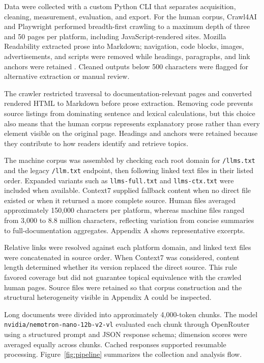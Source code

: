\documentclass[10pt,conference,a4paper]{IEEEtran}
\makeatletter
\def\subsection{\@startsection{subsection}{2}{\z@}{6pt}{3pt}{\normalfont\normalsize\itshape}}
\makeatother
\begin{document}
\subsection{Data Collection}

Data were collected with a custom Python CLI that separates acquisition, cleaning, measurement, evaluation, and export. For the human corpus, Crawl4AI and Playwright performed breadth-first crawling to a maximum depth of three and 50 pages per platform, including JavaScript-rendered sites. Mozilla Readability extracted prose into Markdown; navigation, code blocks, images, advertisements, and scripts were removed while headings, paragraphs, and link anchors were retained \cite{MozillaReadability}. Cleaned outputs below 500 characters were flagged for alternative extraction or manual review.

The crawler restricted traversal to documentation-relevant pages and converted rendered HTML to Markdown before prose extraction. Removing code prevents source listings from dominating sentence and lexical calculations, but this choice also means that the human corpus represents explanatory prose rather than every element visible on the original page. Headings and anchors were retained because they contribute to how readers identify and retrieve topics.

The machine corpus was assembled by checking each root domain for \texttt{/llms.txt} and the legacy \texttt{/llm.txt} endpoint, then following linked text files in their listed order. Expanded variants such as \texttt{llms-full.txt} and \texttt{llms-ctx.txt} were included when available. Context7 supplied fallback content when no direct file existed or when it returned a more complete source. Human files averaged approximately 150,000 characters per platform, whereas machine files ranged from 3,000 to 8.8 million characters, reflecting variation from concise summaries to full-documentation aggregates. Appendix A shows representative excerpts.

Relative links were resolved against each platform domain, and linked text files were concatenated in source order. When Context7 was considered, content length determined whether its version replaced the direct source. This rule favored coverage but did not guarantee topical equivalence with the crawled human pages. Source files were retained so that corpus construction and the structural heterogeneity visible in Appendix A could be inspected.

Long documents were divided into approximately 4,000-token chunks. The model \texttt{nvidia/nemotron-nano-12b-v2-vl} evaluated each chunk through OpenRouter \cite{OpenRouter2024} using a structured prompt and JSON response schema; dimension scores were averaged equally across chunks. Cached responses supported resumable processing. Figure~\ref{fig:pipeline} summarizes the collection and analysis flow.
\end{document}
